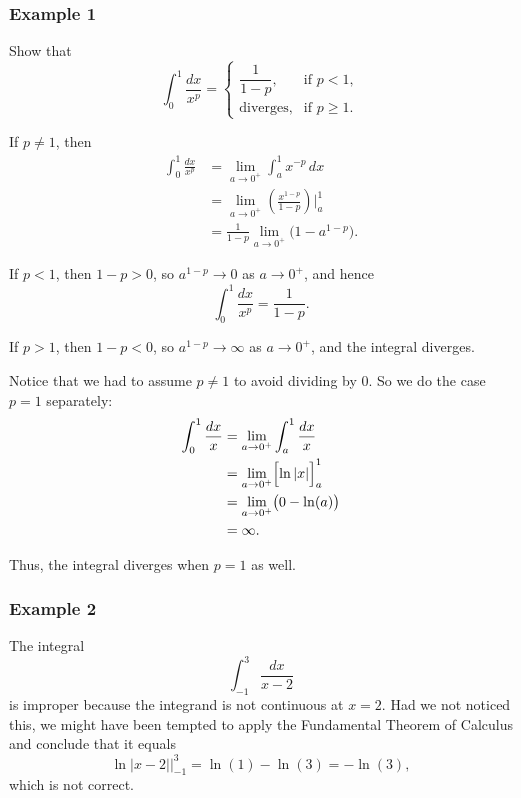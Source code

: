 \subsubsection{Example 1}
\label{sss:exam-acc3}

Show that
\[
\int_0^1 \frac{dx}{x^p}
=
\begin{cases}
\dfrac{1}{1-p}, & \text{if } p<1, \\[4pt]
\text{diverges}, & \text{if } p\ge 1.
\end{cases}
\]

If $p\ne 1$, then
\begin{align}
\int_0^1 \frac{dx}{x^p}
&= \lim_{a\to 0^+}\int_a^1 x^{-p}\,dx \\
&= \lim_{a\to 0^+}\left(\frac{x^{1-p}}{1-p}\right)\Bigg|_a^1 \\
&= \frac{1}{1-p}\lim_{a\to 0^+}\bigl(1-a^{1-p}\bigr).
\end{align}

If $p<1$, then $1-p>0$, so $a^{1-p}\to 0$ as $a\to 0^+$, and hence
\[
\int_0^1 \frac{dx}{x^p} = \frac{1}{1-p}.
\]

If $p>1$, then $1-p<0$, so $a^{1-p}\to\infty$ as $a\to 0^+$, and the integral diverges.

Notice that we had to assume $p\ne 1$ to avoid dividing by $0$. So we do the case $p=1$ separately:
\begin{align}
\int_0^1 \frac{dx}{x}
&= \lim_{a\to 0^+}\int_a^1 \frac{dx}{x} \\
&= \lim_{a\to 0^+}\Bigl[\ln|x|\Bigr]_a^1 \\
&= \lim_{a\to 0^+}\bigl(0-\ln(a)\bigr) \\
&= \infty.
\end{align}

Thus, the integral diverges when $p=1$ as well.

\subsubsection{Example 2}
\label{sss:exam-5bdd}

The integral
\[
\int_{-1}^3 \frac{dx}{x-2}
\]
is improper because the integrand is not continuous at $x=2$. Had we not noticed this, we might have been tempted to apply the Fundamental Theorem of Calculus and conclude that it equals
\[
\ln|x-2|\Big|_{-1}^3 = \ln(1)-\ln(3) = -\ln(3),
\]
which is not correct.

